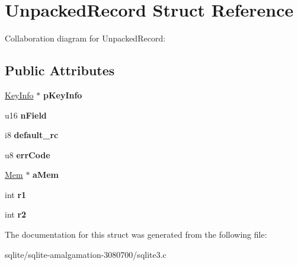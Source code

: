 \hypertarget{struct_unpacked_record}{\section{Unpacked\+Record Struct Reference}
\label{struct_unpacked_record}
}


Collaboration diagram for Unpacked\+Record\+:
\subsection*{Public Attributes}
\begin{DoxyCompactItemize}
\item 
\hypertarget{struct_unpacked_record_aeb43e7a1e300857cab2cbe98eacd575b}{\hyperlink{struct_key_info}{Key\+Info} $\ast$ {\bfseries p\+Key\+Info}}\label{struct_unpacked_record_aeb43e7a1e300857cab2cbe98eacd575b}

\item 
\hypertarget{struct_unpacked_record_a2c5062735cdbc5039679d255cc900668}{u16 {\bfseries n\+Field}}\label{struct_unpacked_record_a2c5062735cdbc5039679d255cc900668}

\item 
\hypertarget{struct_unpacked_record_a8f18c6e59de409bf543de0965652faa9}{i8 {\bfseries default\+\_\+rc}}\label{struct_unpacked_record_a8f18c6e59de409bf543de0965652faa9}

\item 
\hypertarget{struct_unpacked_record_a5c42d9878256f14c87f0e099b31da4bb}{u8 {\bfseries err\+Code}}\label{struct_unpacked_record_a5c42d9878256f14c87f0e099b31da4bb}

\item 
\hypertarget{struct_unpacked_record_a3299c322ceb8b758dacc59701021ae9f}{\hyperlink{struct_mem}{Mem} $\ast$ {\bfseries a\+Mem}}\label{struct_unpacked_record_a3299c322ceb8b758dacc59701021ae9f}

\item 
\hypertarget{struct_unpacked_record_a663a0ab41c25b6c01a7bb19b7db7b7f9}{int {\bfseries r1}}\label{struct_unpacked_record_a663a0ab41c25b6c01a7bb19b7db7b7f9}

\item 
\hypertarget{struct_unpacked_record_a3d68ece4d047523069390179861eccc0}{int {\bfseries r2}}\label{struct_unpacked_record_a3d68ece4d047523069390179861eccc0}

\end{DoxyCompactItemize}


The documentation for this struct was generated from the following file\+:\begin{DoxyCompactItemize}
\item 
sqlite/sqlite-\/amalgamation-\/3080700/sqlite3.\+c\end{DoxyCompactItemize}
